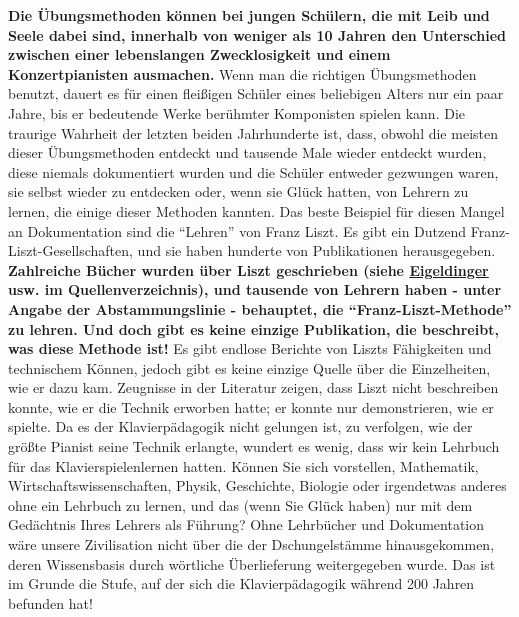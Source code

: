 \textbf{Die Übungsmethoden können bei jungen Schülern, die mit Leib und Seele dabei sind, innerhalb von weniger als 10 Jahren den Unterschied zwischen einer lebenslangen Zwecklosigkeit und einem Konzertpianisten ausmachen.}
 Wenn man die richtigen Übungsmethoden benutzt, dauert es für einen fleißigen Schüler eines beliebigen Alters nur ein paar Jahre, bis er bedeutende Werke berühmter Komponisten spielen kann.
 Die traurige Wahrheit der letzten beiden Jahrhunderte ist, dass, obwohl die meisten dieser Übungsmethoden entdeckt und tausende Male wieder entdeckt wurden, diese niemals dokumentiert wurden und die Schüler entweder gezwungen waren, sie selbst wieder zu entdecken oder, wenn sie Glück hatten, von Lehrern zu lernen, die einige dieser Methoden kannten.
 Das beste Beispiel für diesen Mangel an Dokumentation sind die \enquote{Lehren} von Franz Liszt.
 Es gibt ein Dutzend Franz-Liszt-Gesellschaften, und sie haben hunderte von Publikationen herausgegeben.
 \textbf{Zahlreiche Bücher wurden über Liszt geschrieben (siehe \hyperlink{Eigeldinger}{Eigeldinger} usw. im Quellenverzeichnis), und tausende von Lehrern haben - unter Angabe der Abstammungslinie - behauptet, die \enquote{Franz-Liszt-Methode} zu lehren.
 Und doch gibt es keine einzige Publikation, die beschreibt, was diese Methode ist!}
 Es gibt endlose Berichte von Liszts Fähigkeiten und technischem Können, jedoch gibt es keine einzige Quelle über die Einzelheiten, wie er dazu kam.
 Zeugnisse in der Literatur zeigen, dass Liszt nicht beschreiben konnte, wie er die Technik erworben hatte; er konnte nur demonstrieren, wie er spielte.
 Da es der Klavierpädagogik nicht gelungen ist, zu verfolgen, wie der größte Pianist seine Technik erlangte, wundert es wenig, dass wir kein Lehrbuch für das Klavierspielenlernen hatten.
 Können Sie sich vorstellen, Mathematik, Wirtschaftswissenschaften, Physik, Geschichte, Biologie oder irgendetwas anderes ohne ein Lehrbuch zu lernen, und das (wenn Sie Glück haben) nur mit dem Gedächtnis Ihres Lehrers als Führung?
 Ohne Lehrbücher und Dokumentation wäre unsere Zivilisation nicht über die der Dschungelstämme hinausgekommen, deren Wissensbasis durch wörtliche Überlieferung weitergegeben wurde.
 Das ist im Grunde die Stufe, auf der sich die Klavierpädagogik während 200 Jahren befunden hat!
 

